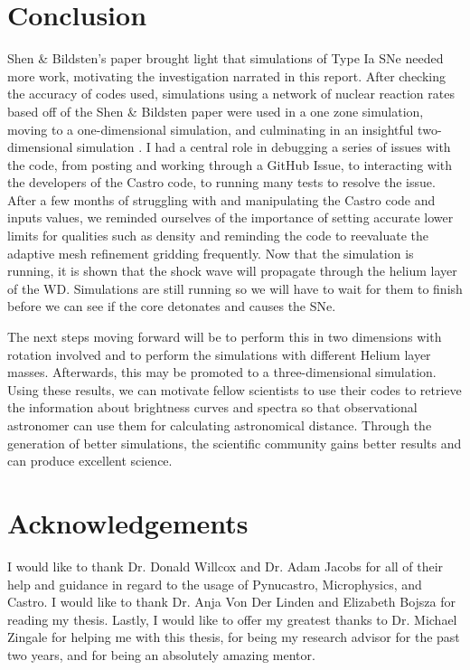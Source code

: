 \documentclass[preprint]{aastex62}
\begin{document}
\newpage

\section{Conclusion}

  
  Shen \& Bildsten's paper brought light that simulations of Type Ia SNe needed more work, motivating the investigation narrated in this report. After checking the accuracy of codes used, simulations using a network of nuclear reaction rates based off of the Shen \& Bildsten paper were used in a one zone simulation, moving to a one-dimensional simulation, and culminating in an insightful two-dimensional simulation \citep{shenNbildsten}. I had a central role in debugging a series of issues with the code, from posting and working through a GitHub Issue, to interacting with the developers of the Castro code, to running many tests to resolve the issue. After a few months of struggling with and manipulating the Castro code and inputs values, we reminded ourselves of the importance of setting accurate lower limits for qualities such as density and reminding the code to reevaluate the adaptive mesh refinement gridding frequently. Now that the simulation is running, it is shown that the shock wave will propagate through the helium layer of the WD. Simulations are still running so we will have to wait for them to finish before we can see if the core detonates and causes the SNe. 
  
  The next steps moving forward will be to perform this in two dimensions with rotation involved and to perform the simulations with different Helium layer masses. Afterwards, this may be promoted to a three-dimensional simulation. Using these results, we can motivate fellow scientists to use their codes to retrieve the information about brightness curves and spectra so that observational astronomer can use them for calculating astronomical distance. Through the generation of better simulations, the scientific community gains better results and can produce excellent science. 

  
\section{Acknowledgements}

I would like to thank Dr. Donald Willcox and Dr. Adam Jacobs for all of their help and guidance in regard to the usage of Pynucastro, Microphysics, and Castro. I would like to thank Dr. Anja Von Der Linden and Elizabeth Bojsza for reading my thesis. Lastly, I would like to offer my greatest thanks to Dr. Michael Zingale for helping me with this thesis, for being my research advisor for the past two years, and for being an absolutely amazing mentor. 


\end{document}
